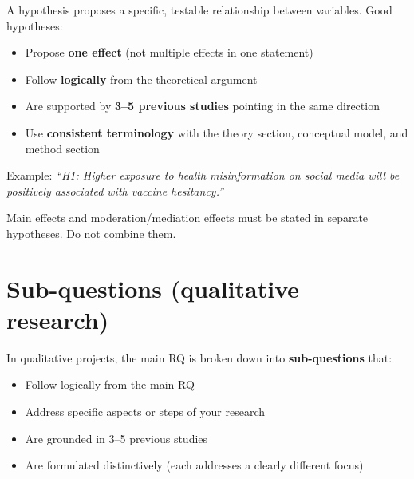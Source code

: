 \documentclass[
  11pt,
  a4paper,
]{scrbook}
\providecommand{\tightlist}{%
  \setlength{\itemsep}{0pt}\setlength{\parskip}{0pt}}\usepackage{longtable,booktabs,array}
\begin{document}
A hypothesis proposes a specific, testable relationship between
variables. Good hypotheses:

\begin{itemize}
\tightlist
\item
  Propose \textbf{one effect} (not multiple effects in one statement)
\item
  Follow \textbf{logically} from the theoretical argument
\item
  Are supported by \textbf{3--5 previous studies} pointing in the same
  direction
\item
  Use \textbf{consistent terminology} with the theory section,
  conceptual model, and method section
\end{itemize}

Example: \emph{``H1: Higher exposure to health misinformation on social
media will be positively associated with vaccine hesitancy.''}

\begin{tcolorbox}[enhanced jigsaw, bottomrule=.15mm, opacityback=0, toprule=.15mm, colframe=quarto-callout-important-color-frame, left=2mm, rightrule=.15mm, title=\textcolor{quarto-callout-important-color}{\faExclamation}\hspace{0.5em}{Moderation and mediation in separate hypotheses}, colbacktitle=quarto-callout-important-color!10!white, bottomtitle=1mm, colback=white, breakable, toptitle=1mm, titlerule=0mm, leftrule=.75mm, arc=.35mm, opacitybacktitle=0.6, coltitle=black]

Main effects and moderation/mediation effects must be stated in separate
hypotheses. Do not combine them.

\end{tcolorbox}

\section{Sub-questions (qualitative
research)}\label{sub-questions-qualitative-research}

In qualitative projects, the main RQ is broken down into
\textbf{sub-questions} that:

\begin{itemize}
\tightlist
\item
  Follow logically from the main RQ
\item
  Address specific aspects or steps of your research
\item
  Are grounded in 3--5 previous studies
\item
  Are formulated distinctively (each addresses a clearly different
  focus)
\end{itemize}
\end{document}
